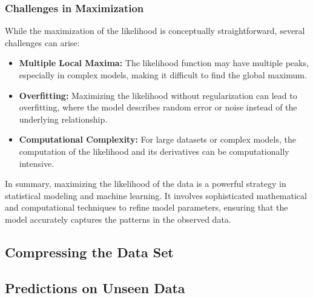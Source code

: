 \subsubsection{Challenges in Maximization}
While the maximization of the likelihood is conceptually straightforward, several challenges can arise:
\begin{itemize}
    \item \textbf{Multiple Local Maxima:} The likelihood function may have multiple peaks, especially in complex models, making it difficult to find the global maximum.
    \item \textbf{Overfitting:} Maximizing the likelihood without regularization can lead to overfitting, where the model describes random error or noise instead of the underlying relationship.
    \item \textbf{Computational Complexity:} For large datasets or complex models, the computation of the likelihood and its derivatives can be computationally intensive.
\end{itemize}

In summary, maximizing the likelihood of the data is a powerful strategy in statistical modeling and machine learning. It involves sophisticated mathematical and computational techniques to refine model parameters, ensuring that the model accurately captures the patterns in the observed data.

\subsection{Compressing the Data Set}
\subsection{Predictions on Unseen Data}